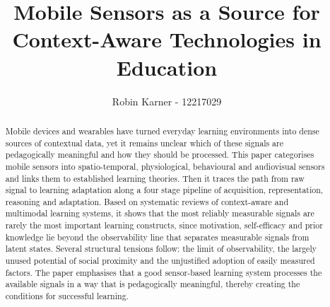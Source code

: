 \documentclass[runningheads]{llncs}
\begin{document}
%
\title{Mobile Sensors as a Source for Context-Aware Technologies in Education}
%
%
\author{Robin Karner - 12217029}
%
%
%
\maketitle              %
%
\begin{abstract}
Mobile devices and wearables have turned everyday learning environments into dense sources of contextual data, yet it remains unclear which of these signals are pedagogically meaningful and how they should be processed. This paper categorises mobile sensors into spatio-temporal, physiological, behavioural and audiovisual sensors and links them to established learning theories. Then it traces the path from raw signal to learning adaptation along a four stage pipeline of acquisition, representation, reasoning and adaptation. Based on systematic reviews of context-aware and multimodal learning systems, it shows that the most reliably measurable signals are rarely the most important learning constructs, since motivation, self-efficacy and prior knowledge lie beyond the observability line that separates measurable signals from latent states. Several structural tensions follow: the limit of observability, the largely unused potential of social proximity and the unjustified adoption of easily measured factors. The paper emphasises that a good sensor-based learning system processes the available signals in a way that is pedagogically meaningful, thereby creating the conditions for successful learning.

\end{abstract}
%
%
%


\end{document}
